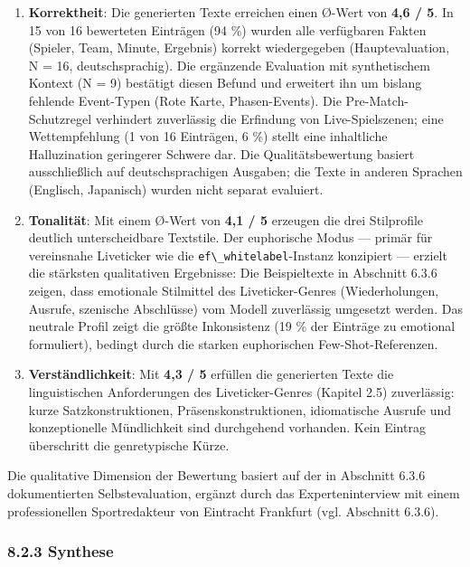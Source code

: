 \begin{enumerate}
\def\labelenumi{\arabic{enumi}.}
\item
  \textbf{Korrektheit}: Die generierten Texte erreichen einen Ø-Wert von
  \textbf{4,6 / 5}. In 15 von 16 bewerteten Einträgen (94 \%) wurden
  alle verfügbaren Fakten (Spieler, Team, Minute, Ergebnis) korrekt
  wiedergegeben (Hauptevaluation, N = 16, deutschsprachig). Die
  ergänzende Evaluation mit synthetischem Kontext (N = 9) bestätigt
  diesen Befund und erweitert ihn um bislang fehlende Event-Typen (Rote
  Karte, Phasen-Events). Die Pre-Match-Schutzregel verhindert
  zuverlässig die Erfindung von Live-Spielszenen; eine Wettempfehlung (1
  von 16 Einträgen, 6 \%) stellt eine inhaltliche Halluzination
  geringerer Schwere dar. Die Qualitätsbewertung basiert ausschließlich
  auf deutschsprachigen Ausgaben; die Texte in anderen Sprachen
  (Englisch, Japanisch) wurden nicht separat evaluiert.
\item
  \textbf{Tonalität}: Mit einem Ø-Wert von \textbf{4,1 / 5} erzeugen die
  drei Stilprofile deutlich unterscheidbare Textstile. Der euphorische
  Modus --- primär für vereinsnahe Liveticker wie die
  \passthrough{\lstinline!ef\_whitelabel!}-Instanz konzipiert ---
  erzielt die stärksten qualitativen Ergebnisse: Die Beispieltexte in
  Abschnitt 6.3.6 zeigen, dass emotionale Stilmittel des
  Liveticker-Genres (Wiederholungen, Ausrufe, szenische Abschlüsse) vom
  Modell zuverlässig umgesetzt werden. Das neutrale Profil zeigt die
  größte Inkonsistenz (19 \% der Einträge zu emotional formuliert),
  bedingt durch die starken euphorischen Few-Shot-Referenzen.
\item
  \textbf{Verständlichkeit}: Mit \textbf{4,3 / 5} erfüllen die
  generierten Texte die linguistischen Anforderungen des
  Liveticker-Genres (Kapitel 2.5) zuverlässig: kurze Satzkonstruktionen,
  Präsenskonstruktionen, idiomatische Ausrufe und konzeptionelle
  Mündlichkeit sind durchgehend vorhanden. Kein Eintrag überschritt die
  genretypische Kürze.
\end{enumerate}

Die qualitative Dimension der Bewertung basiert auf der in Abschnitt
6.3.6 dokumentierten Selbstevaluation, ergänzt durch das
Experteninterview mit einem professionellen Sportredakteur von Eintracht
Frankfurt (vgl. Abschnitt 6.3.6).

\subsubsection{8.2.3 Synthese}\label{synthese}

